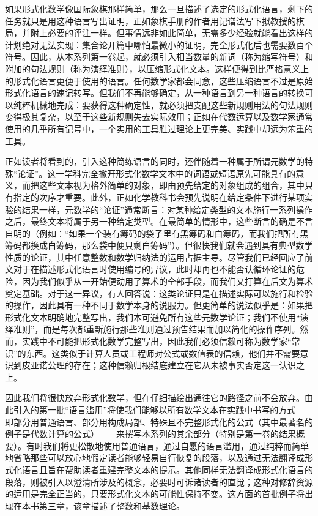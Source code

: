 如果形式化数学像国际象棋那样简单，那么一旦描述了选定的形式化语言，剩下的任务就只是用这种语言写出证明，正如象棋手册的作者用记谱法写下拟教授的棋局，并附上必要的评注一样。但事情远非如此简单，无需多少经验就能看出这样的计划绝对无法实现：集合论开篇中哪怕最微小的证明，完全形式化后也需要数百个符号。因此，从本系列第一卷起，就必须引入相当数量的新词（称为缩写符号）和附加的句法规则（称为演绎准则），以压缩形式化文本。这样便得到比严格意义上的形式化语言更便于使用的语言。任何数学家都会同意，这些压缩语言不过是原始形式化语言的速记转写。但我们不再能够确定，从一种语言到另一种语言的转换可以纯粹机械地完成：要获得这种确定性，就必须把支配这些新规则用法的句法规则变得极其复杂，以至于这些新规则失去实际效用；正如在代数运算以及数学家通常使用的几乎所有记号中，一个实用的工具胜过理论上更完美、实践中却远为笨重的工具。

正如读者将看到的，引入这种简练语言的同时，还伴随着一种属于所谓元数学的特殊“论证”。这一学科完全撇开形式化数学文本中的词语或短语原先可能具有的意义，而把这些文本视为格外简单的对象，即由预先给定的对象组成的组合，其中只有指定的次序才重要。此外，正如化学教科书会预先说明在给定条件下进行某项实验的结果一样，元数学的“论证”通常断言：对某种给定类型的文本施行一系列操作之后，最终文本将属于另一种给定类型。在最简单的情形中，这些断言的确是不言自明的（例如：“如果一个装有筹码的袋子里有黑筹码和白筹码，而我们把所有黑筹码都换成白筹码，那么袋中便只剩白筹码”）。但很快我们就会遇到具有典型数学性质的论证，其中任意整数和数学归纳法的运用占据主导。尽管我们已经回应了前文对于在描述形式化语言时使用编号的异议，此时却再也不能否认循环论证的危险，因为我们似乎从一开始便动用了算术的全部手段，而我们又打算在后文为算术奠定基础。对于这一异议，有人回答说：这类论证只是在描述实际可以施行和检验的操作，因此具有一种不同于数学本身的说服力。但更简单的说法似乎是：如果把形式化文本明确地完整写出，我们本可避免所有这些元数学论证；我们不使用“演绎准则”，而是每次都重新施行那些准则通过预告结果而加以简化的操作序列。然而，实践中不可能把形式化数学完整写出，因此我们必须信赖可称为数学家“常识”的东西。这类似于计算人员或工程师对公式或数值表的信赖，他们并不需要意识到皮亚诺公理的存在；这种信赖归根结底建立在它从未被事实否定这一认识之上。

因此我们将很快放弃形式化数学，但在仔细描绘出通往它的路径之前不会放弃。由此引入的第一批“语言滥用”将使我们能够以所有数学文本在实践中书写的方式——即部分用普通语言、部分用构成局部、特殊且不完整形式化的公式（其中最著名的例子是代数计算的公式）——来撰写本系列的其余部分（特别是第一卷的结果概要）。有时我们将更松散地使用普通语言，通过自愿的语言滥用，通过纯粹而简单地省略那些可以放心地假定读者能够轻易自行恢复的段落，以及通过无法翻译成形式化语言且旨在帮助读者重建完整文本的提示。其他同样无法翻译成形式化语言的段落，则被引入以澄清所涉及的概念，必要时可诉诸读者的直觉；这种对修辞资源的运用是完全正当的，只要形式化文本的可能性保持不变。这方面的首批例子将出现在本书第三章，该章描述了整数和基数理论。

